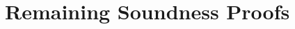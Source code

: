 \appendix

\chapter{Remaining Soundness Proofs}
\label{cha:remaining-soundness-proofs}














